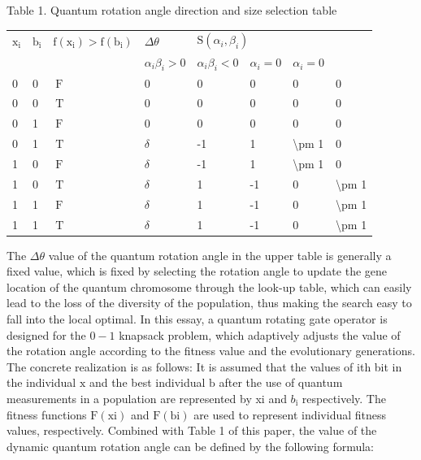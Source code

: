 \documentclass[10pt]{article}
\begin{document}
Table 1. Quantum rotation angle direction and size selection table

\begin{center}
\begin{tabular}{l|l|l|l|l|l|l|l}
\hline
$\mathrm{x}_{\mathrm{i}}$ & $\mathrm{b}_{\mathrm{i}}$ & $\mathrm{f}\left(\mathrm{x}_{\mathrm{i}}\right)>\mathrm{f}\left(\mathrm{b}_{\mathrm{i}}\right)$ & $\Delta \theta$ & \multicolumn{4}{|l}{$\mathrm{S}\left(\alpha_{i}, \beta_{i}\right)$} \\
\cline { 4 - 8 }
 &  &  & $\alpha_{i} \beta_{i}>0$ & $\alpha_{i} \beta_{i}<0$ & $\alpha_{i}=0$ & $\alpha_{i}=0$ &  \\
\hline
0 & 0 & $\mathrm{~F}$ & 0 & 0 & 0 & 0 & 0 \\
\hline
0 & 0 & $\mathrm{~T}$ & 0 & 0 & 0 & 0 & 0 \\
\hline
0 & 1 & $\mathrm{~F}$ & 0 & 0 & 0 & 0 & 0 \\
\hline
0 & 1 & $\mathrm{~T}$ & $\delta$ & -1 & 1 & \textbackslash pm 1 & 0 \\
\hline
1 & 0 & $\mathrm{~F}$ & $\delta$ & -1 & 1 & \textbackslash pm 1 & 0 \\
\hline
1 & 0 & $\mathrm{~T}$ & $\delta$ & 1 & -1 & 0 & \textbackslash pm 1 \\
\hline
1 & 1 & $\mathrm{~F}$ & $\delta$ & 1 & -1 & 0 & \textbackslash pm 1 \\
\hline
1 & 1 & $\mathrm{~T}$ & $\delta$ & 1 & -1 & 0 & \textbackslash pm 1 \\
\hline
\end{tabular}
\end{center}

The $\Delta \theta$ value of the quantum rotation angle in the upper table is generally a fixed value, which is fixed by selecting the rotation angle to update the gene location of the quantum chromosome through the look-up table, which can easily lead to the loss of the diversity of the population, thus making the search easy to fall into the local optimal. In this essay, a quantum rotating gate operator is designed for the $0-1$ knapsack problem, which adaptively adjusts the value of the rotation angle according to the fitness value and the evolutionary generations. The concrete realization is as follows: It is assumed that the values of ith bit in the individual $\mathrm{x}$ and the best individual $\mathrm{b}$ after the use of quantum measurements in a population are represented by xi and $b_{\mathrm{i}}$ respectively. The fitness functions $\mathrm{F}(\mathrm{xi})$ and $\mathrm{F}(\mathrm{bi})$ are used to represent individual fitness values, respectively. Combined with Table 1 of this paper, the value of the dynamic quantum rotation angle can be defined by the following formula:
\end{document}
